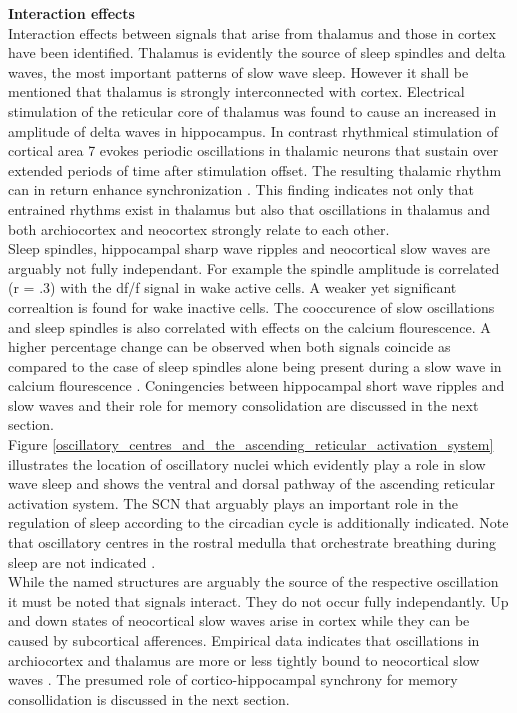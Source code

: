 \textbf{Interaction effects}\\
Interaction effects between signals that arise from thalamus and those in cortex have been identified. Thalamus is evidently the source of sleep spindles and delta waves, the most important patterns of slow wave sleep. However it shall be mentioned that thalamus is strongly interconnected with cortex. Electrical stimulation of the reticular core of thalamus was found to cause an increased in amplitude of delta waves in hippocampus. In contrast rhythmical stimulation of cortical area 7 evokes periodic oscillations in thalamic neurons that sustain over extended periods of time after stimulation offset. The resulting thalamic rhythm can in return enhance synchronization \parencite[p. 21]{steriade1984thalamus}. This finding indicates not only that entrained rhythms exist in thalamus but also that oscillations in thalamus and both archiocortex and neocortex strongly relate to each other.\\
Sleep spindles, hippocampal sharp wave ripples and neocortical slow waves are arguably not fully independant. For example the spindle amplitude is correlated (r = .3) with the df/f signal in wake active cells. A weaker yet significant correaltion is found for wake inactive cells. The cooccurence of slow oscillations and sleep spindles is also correlated with effects on the calcium flourescence. A higher percentage change can be observed when both signals coincide as compared to the case of sleep spindles alone being present during a slow wave in calcium flourescence \parencite{niethard2018cortical}. Coningencies between hippocampal short wave ripples and slow waves and their role for memory consolidation are discussed in the next section.\\
Figure \ref{oscillatory_centres_and_the_ascending_reticular_activation_system} illustrates the location of oscillatory nuclei which evidently play a role in slow wave sleep and shows the ventral and dorsal pathway of the ascending reticular activation system. The SCN that arguably plays an important role in the regulation of sleep according to the circadian cycle is additionally indicated. Note that oscillatory centres in the rostral medulla that orchestrate breathing during sleep are not indicated \parencite{kubin2019interactions}.\\
While the named structures are arguably the source of the respective oscillation it must be noted that signals interact. They do not occur fully independantly. Up and down states of neocortical slow waves arise in cortex while they can be caused by subcortical afferences. Empirical data indicates that oscillations in archiocortex and thalamus are more or less tightly bound to neocortical slow waves \parencite{niethard2018cortical}. The presumed role of cortico-hippocampal synchrony for memory consollidation is discussed in the next section.\\

